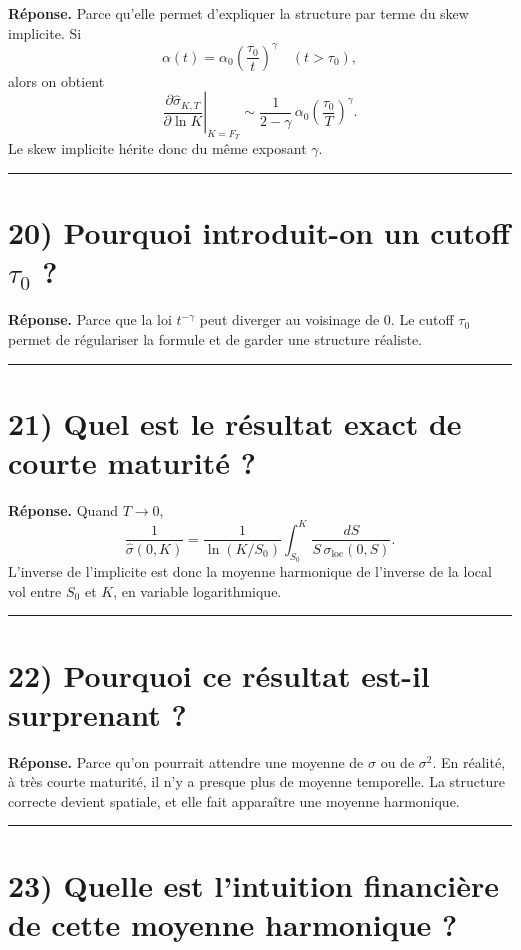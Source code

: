 \documentclass[11pt,a4paper]{article}
\begin{document}
\textbf{Réponse.}  
Parce qu’elle permet d’expliquer la structure par terme du skew implicite.  
Si
\[
\alpha(t)=\alpha_0\left(\frac{\tau_0}{t}\right)^\gamma
\quad (t>\tau_0),
\]
alors on obtient
\[
\left.\frac{\partial \hat{\sigma}_{K,T}}{\partial \ln K}\right|_{K=F_T}
\sim
\frac{1}{2-\gamma}\,
\alpha_0\left(\frac{\tau_0}{T}\right)^\gamma.
\]
Le skew implicite hérite donc du même exposant \(\gamma\).

\bigskip\hrule\bigskip

\section{20) Pourquoi introduit-on un cutoff \(\tau_0\) ?}

\textbf{Réponse.}  
Parce que la loi \(t^{-\gamma}\) peut diverger au voisinage de \(0\).  
Le cutoff \(\tau_0\) permet de régulariser la formule et de garder une structure réaliste.

\bigskip\hrule\bigskip

\section{21) Quel est le résultat exact de courte maturité ?}

\textbf{Réponse.}  
Quand \(T\to 0\),
\[
\frac{1}{\hat{\sigma}(0,K)}
=
\frac{1}{\ln(K/S_0)}
\int_{S_0}^{K}\frac{dS}{S\,\sigma_{\mathrm{loc}}(0,S)}.
\]
L’inverse de l’implicite est donc la moyenne harmonique de l’inverse de la local vol entre \(S_0\) et \(K\), en variable logarithmique.

\bigskip\hrule\bigskip

\section{22) Pourquoi ce résultat est-il surprenant ?}

\textbf{Réponse.}  
Parce qu’on pourrait attendre une moyenne de \(\sigma\) ou de \(\sigma^2\).  
En réalité, à très courte maturité, il n’y a presque plus de moyenne temporelle. La structure correcte devient spatiale, et elle fait apparaître une moyenne harmonique.

\bigskip\hrule\bigskip

\section{23) Quelle est l’intuition financière de cette moyenne harmonique ?}
\end{document}

